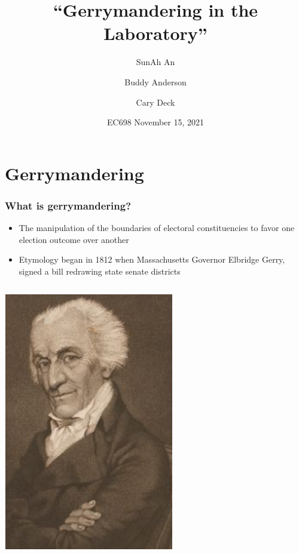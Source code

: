 \documentclass[red]{beamer}
\title{“Gerrymandering in the Laboratory”}
\author{SunAh An \and Buddy Anderson \and Cary Deck}
\institute{The University of Alabama}
\date{EC698 November 15, 2021}
\begin{document}
\begin{frame}
\titlepage
\end{frame}





    \section{Gerrymandering}
    \begin{frame} [t]
    \frametitle{What is gerrymandering?}
    \begin{itemize}
        \item The manipulation of the boundaries of electoral constituencies to favor one election outcome over another
        \item Etymology began in 1812 when Massachusetts Governor Elbridge Gerry, signed a bill redrawing state senate districts
    \end{itemize}
    \begin{columns}
    \begin{column}{0.45\textwidth}
    \begin{center}
    \includegraphics[scale = .40]{elbridge_gerry.png}
    \label{fig:gerry}
    \end{center}
    \end{column}
    \begin{column}{0.45\textwidth}

\end{column}
\end{columns}
\end{frame}
\end{document}
